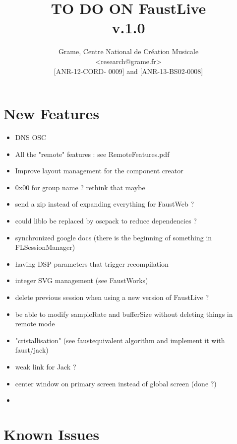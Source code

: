 \documentclass[a4paper]{article}
\begin{document}
\title{TO DO ON FaustLive \\ v.1.0}

\author{Grame, Centre National de Création Musicale\\
{\small <research@grame.fr>} \\
\vspace{2mm}
[ANR-12-CORD- 0009] and [ANR-13-BS02-0008]
}

\maketitle


\newpage
\section{New Features}

\begin{itemize}
\item DNS OSC 
\item All the "remote" features : see RemoteFeatures.pdf
\item Improve layout management for the component creator
\item 0x00 for group name ? rethink that maybe
\item send a zip instead of expanding everything for FaustWeb ?
\item could liblo be replaced by oscpack to reduce dependencies ?
\item synchronized google docs (there is the beginning of something in FLSessionManager)
\item having DSP parameters that trigger recompilation
\item integer SVG management (see FaustWorks)
\item delete previous session when using a new version of FaustLive ?
\item be able to modify sampleRate and bufferSize without deleting things in remote mode
\item "cristallisation" (see faustequivalent algorithm and implement it with faust/jack)
\item weak link for Jack ?
\item center window on primary screen instead of global screen (done ?)
\item 
\end{itemize}

\section{Known Issues}
\end{document}
